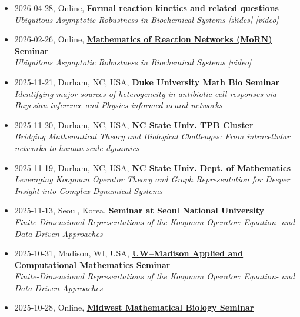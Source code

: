\documentclass[margin,line]{res}
\begin{document}
\begin{resume}
\begin{itemize}[leftmargin=0pt, label={}]
    \textit{Global Linearization of Nonlinear Dynamics via Koopman Operators: A Gentle Introduction, Applications, and Open Challenges}
    \item 2026-04-28, Online, \href{https://math.bme.hu/~jtoth/seminars.html}{\textbf{Formal reaction kinetics and related questions}} \\
    \textit{Ubiquitous Asymptotic Robustness in Biochemical Systems [\href{https://github.com/HyukpyoHong/HyukpyoHong.github.io/releases/download/talks-2026/20260428_FormalReactionKinetics_Ubiq.pdf}{\ul{slides}}] [\href{https://youtu.be/UGHbM6dK7qo?si=iq3MJ9as1dHn2DSf}{\ul{video}}]}
    \item 2026-02-26, Online, \href{https://researchseminars.org/seminar/MoRN}{\textbf{Mathematics of Reaction Networks (MoRN) Seminar}} \\
    \textit{Ubiquitous Asymptotic Robustness in Biochemical Systems [\href{https://youtu.be/F-9l6U9fvzM}{\ul{video}}]}
    \item 2025-11-21, Durham, NC, USA, \textbf{Duke University Math Bio Seminar} \\
    \textit{Identifying major sources of heterogeneity in antibiotic cell responses via Bayesian inference and Physics-informed neural networks}
    \item 2025-11-20, Durham, NC, USA, \textbf{NC State Univ. TPB Cluster} \\
    \textit{Bridging Mathematical Theory and Biological Challenges: From intracellular networks to human-scale dynamics}
    \item 2025-11-19, Durham, NC, USA, \textbf{NC State Univ. Dept. of Mathematics} \\
    \textit{Leveraging Koopman Operator Theory and Graph Representation for Deeper Insight into Complex Dynamical Systems}
    \item 2025-11-13, Seoul, Korea, \textbf{Seminar at Seoul National University} \\
    \textit{Finite-Dimensional Representations of the Koopman Operator: Equation- and Data-Driven Approaches}
    \item 2025-10-31, Madison, WI, USA, \href{https://wiki.math.wisc.edu/index.php/Applied/ACMS}{\textbf{UW–Madison Applied and Computational Mathematics Seminar}} \\
    \textit{Finite-Dimensional Representations of the Koopman Operator: Equation- and Data-Driven Approaches}
    \item 2025-10-28, Online, \href{https://sites.google.com/view/midwest-mathbio-seminar/home}{\textbf{Midwest Mathematical Biology Seminar}} \\

\end{itemize}
\end{resume}
\end{document}

